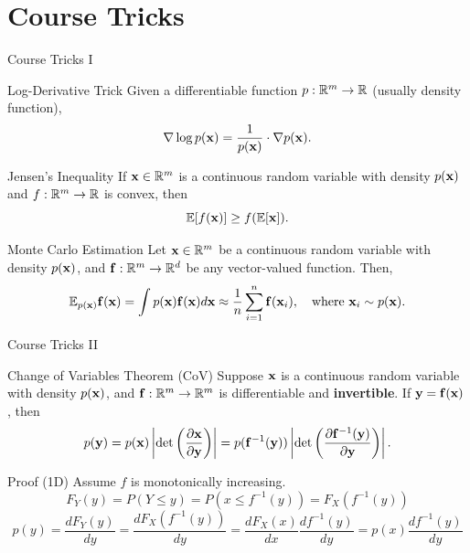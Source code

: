 \documentclass{beamer}
\begin{document}
\section{Course Tricks}
\begin{frame}{Course Tricks I}
	\begin{block}{Log-Derivative Trick}
		Given a differentiable function $p: \mathbb{R}^m \to \mathbb{R}$ (usually density function),
		$$
			\nabla \log p(\mathbf{x}) = \frac{1}{p(\mathbf{x})} \cdot \nabla p(\mathbf{x}).
		$$
		\vspace{-0.5cm}
	\end{block}
    \eqpause
	\begin{block}{Jensen's Inequality}
		If $\mathbf{x} \in \mathbb{R}^m$ is a continuous random variable with density $p(\mathbf{x})$ and $f: \mathbb{R}^m \to \mathbb{R}$ is convex, then
		$$
			\mathbb{E}[f(\mathbf{x})] \geq f(\mathbb{E}[\mathbf{x}]).
		$$
		\vspace{-0.7cm}
	\end{block}
    \eqpause
	\begin{block}{Monte Carlo Estimation}
		Let $\mathbf{x} \in \mathbb{R}^m$ be a continuous random variable with density $p(\mathbf{x})$, and $\mathbf{f}: \mathbb{R}^m \to \mathbb{R}^d$ be any vector-valued function. Then,
		$$
			\mathbb{E}_{p(\mathbf{x})} \mathbf{f}(\mathbf{x}) = \int p(\mathbf{x}) \mathbf{f}(\mathbf{x}) d \mathbf{x} \approx \frac{1}{n} \sum_{i=1}^n \mathbf{f}(\mathbf{x}_i), \quad 
			\text{where } \mathbf{x}_i \sim p(\mathbf{x}).
		$$
		\vspace{-0.4cm}
	\end{block}
\end{frame}
\begin{frame}{Course Tricks II}
	\begin{block}{Change of Variables Theorem (CoV)}
		Suppose $\mathbf{x}$ is a continuous random variable with density $p(\mathbf{x})$, and $\mathbf{f}: \mathbb{R}^m \to \mathbb{R}^m$ is differentiable and \textbf{invertible}. If $\mathbf{y} = \mathbf{f}(\mathbf{x})$, then
		\[
			p(\mathbf{y}) = p(\mathbf{x}) \left|\det \left(  \frac{\partial \mathbf{x}}{\partial \mathbf{y}} \right) \right| = p(\mathbf{f}^{-1}(\mathbf{y})) \left|\det \left(  \frac{\partial \mathbf{f}^{-1}(\mathbf{y})}{\partial \mathbf{y}} \right) \right|.
		\]
		\vspace{-0.5cm}
	\end{block}
    \eqpause
	\begin{block}{Proof (1D)}
		Assume $f$ is monotonically increasing.
		\[
			F_Y(y) = P(Y \leq y) = P(x \leq f^{-1}(y)) = F_X(f^{-1}(y))
		\]
        \eqpause
		$$
			p(y) = \frac{dF_Y(y)}{dy} = \frac{dF_X(f^{-1}(y))}{dy} = \frac{dF_X(x)}{dx} \frac{df^{-1}(y)}{dy} =  p(x) \frac{df^{-1}(y)}{dy}
		$$
	\end{block}
\end{frame}
\end{document}

